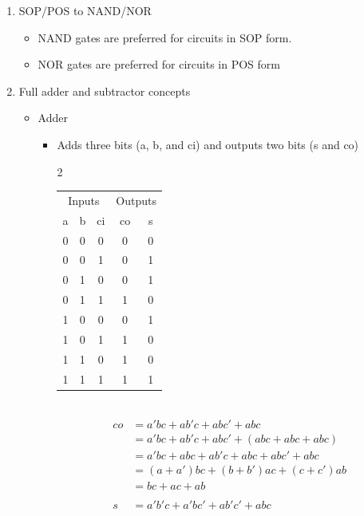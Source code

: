 \documentclass[main.tex]{subfiles}
\begin{document}
\begin{enumerate}
    
    \item SOP/POS to NAND/NOR \cite{universal_gate}
    \begin{itemize}
        \item NAND gates are preferred for circuits in SOP form.
        \item NOR gates are preferred for circuits in POS form
    \end{itemize}
    \item Full adder and subtractor concepts \cite{full_add}
    \begin{itemize}
        \item Adder
        \begin{itemize}
            \item Adds three bits (a, b, and ci) and outputs two bits (s and co) \\
            \begin{multicols}{2}
            \begin{tabular}{ccc|cc}
                \multicolumn{3}{c|}{Inputs} & \multicolumn{2}{c}{Outputs}  \\
                 a & b & ci & co & s \\\hline
                 0 & 0 & 0 & 0 & 0 \\
                 0 & 0 & 1 & 0 & 1 \\
                 0 & 1 & 0 & 0 & 1 \\
                 0 & 1 & 1 & 1 & 0 \\
                 1 & 0 & 0 & 0 & 1 \\
                 1 & 0 & 1 & 1 & 0 \\
                 1 & 1 & 0 & 1 & 0 \\
                 1 & 1 & 1 & 1 & 1 \\
            \end{tabular} 
            \\
            \begin{align*}
                co &= a'bc+ab'c+abc'+abc \\
                &= a'bc+ab'c+abc'+(abc +abc+abc) \\
                &= a'bc+abc+ab'c+abc+abc'+abc \\
                &= (a+a')bc+(b+b')ac+(c+c')ab \\
                &= bc + ac + ab \\
                \\
                s &= a'b'c + a'bc' + ab'c' + abc \\

\end{align*}
\end{multicols}
\end{itemize}
\end{itemize}
\end{enumerate}
\end{document}
